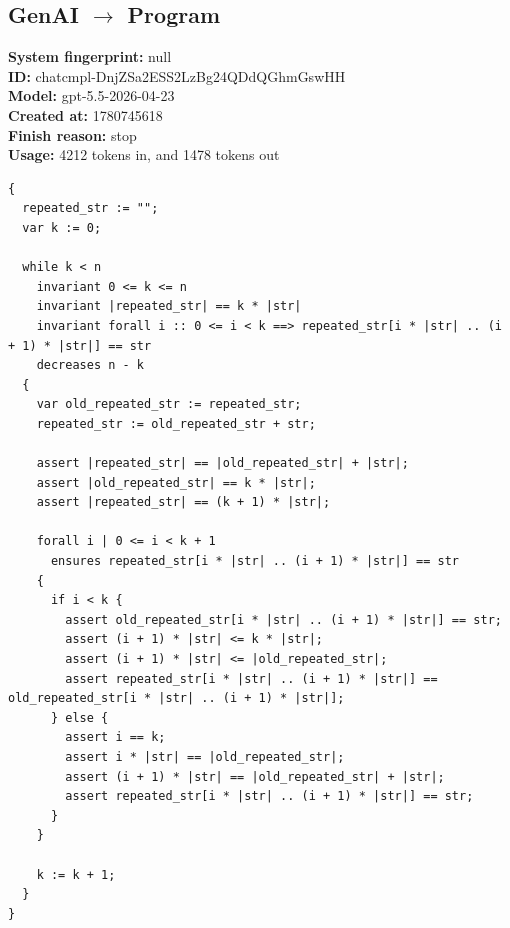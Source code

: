 \documentclass{article}
\begin{document}
\subsection*{GenAI $\rightarrow$ Program}
\textbf{System fingerprint: }null
\\\textbf{ID: }chatcmpl-DnjZSa2ESS2LzBg24QDdQGhmGswHH
\\\textbf{Model: }gpt-5.5-2026-04-23
\\\textbf{Created at: }1780745618
\\\textbf{Finish reason: }stop
\\\textbf{Usage: }4212 tokens in, and 1478 tokens out
\begin{lstlisting}
{
  repeated_str := "";
  var k := 0;

  while k < n
    invariant 0 <= k <= n
    invariant |repeated_str| == k * |str|
    invariant forall i :: 0 <= i < k ==> repeated_str[i * |str| .. (i + 1) * |str|] == str
    decreases n - k
  {
    var old_repeated_str := repeated_str;
    repeated_str := old_repeated_str + str;

    assert |repeated_str| == |old_repeated_str| + |str|;
    assert |old_repeated_str| == k * |str|;
    assert |repeated_str| == (k + 1) * |str|;

    forall i | 0 <= i < k + 1
      ensures repeated_str[i * |str| .. (i + 1) * |str|] == str
    {
      if i < k {
        assert old_repeated_str[i * |str| .. (i + 1) * |str|] == str;
        assert (i + 1) * |str| <= k * |str|;
        assert (i + 1) * |str| <= |old_repeated_str|;
        assert repeated_str[i * |str| .. (i + 1) * |str|] == old_repeated_str[i * |str| .. (i + 1) * |str|];
      } else {
        assert i == k;
        assert i * |str| == |old_repeated_str|;
        assert (i + 1) * |str| == |old_repeated_str| + |str|;
        assert repeated_str[i * |str| .. (i + 1) * |str|] == str;
      }
    }

    k := k + 1;
  }
}
\end{lstlisting}
\end{document}

